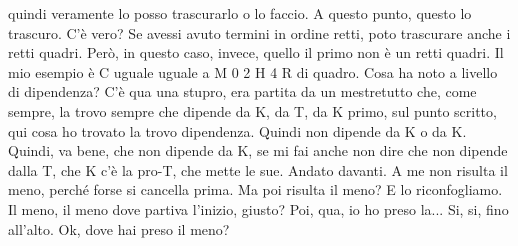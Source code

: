 \begin{soluzione}
{quindi veramente lo posso trascurarlo o lo faccio. A questo punto, questo lo trascuro. C'è vero? Se avessi avuto termini in ordine retti, poto trascurare anche i retti quadri. Però, in questo caso, invece, quello il primo non è un retti quadri. Il mio esempio è C uguale uguale a M 0 2 H 4 R di quadro. Cosa ha noto a livello di dipendenza? C'è qua una stupro, era partita da un mestretutto che, come sempre, la trovo sempre che dipende da K, da T, da K primo, sul punto scritto, qui cosa ho trovato la trovo dipendenza. Quindi non dipende da K o da K. Quindi, va bene, che non dipende da K, se mi fai anche non dire che non dipende dalla T, che K c'è la pro-T, che mette le sue. Andato davanti. A me non risulta il meno, perché forse si cancella prima. Ma poi risulta il meno? E lo riconfogliamo. Il meno, il meno dove partiva l'inizio, giusto? Poi, qua, io ho preso la... Si, si, fino all'alto. Ok, dove hai preso il meno? 
   
}
\end{soluzione}
